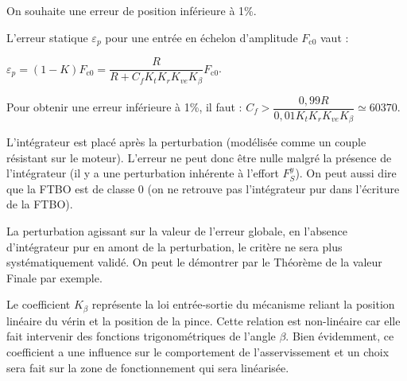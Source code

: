 On souhaite une erreur de position inférieure à 1\%.

\ifprof
\begin{corrige}
L’erreur statique $\varepsilon_p$ pour une entrée en échelon d’amplitude $F_{\text{c0}}$ vaut :

$\varepsilon_p=(1-K) F_{\text{c0}}=\dfrac{R}{R+C_f K_t K_r K_{ve} K_{\beta} } F_{\text{c0}}$.

Pour obtenir une erreur inférieure à 1\%, il faut :
$C_f>\dfrac{0,99R}{0,01K_t K_r K_{ve} K_{\beta} } \simeq 60370$.

\end{corrige}
\else
\fi

\ifprof
\begin{corrige}
L’intégrateur est placé  après la perturbation (modélisée comme un couple résistant sur le moteur). L’erreur ne peut donc être nulle malgré la présence de l’intégrateur (il y a une perturbation inhérente à l’effort $F_S^y$).
On peut aussi dire que la FTBO est de classe 0 (on ne retrouve pas l’intégrateur pur dans l’écriture de la FTBO).

\end{corrige}
\else
\fi

\ifprof
\begin{corrige}
La perturbation agissant sur la valeur de l’erreur globale, en l’absence d’intégrateur pur en amont de la perturbation, le critère ne sera plus systématiquement validé. On peut le démontrer par le Théorème de la valeur Finale par exemple.
\end{corrige}
\else
\fi

\ifprof
\begin{corrige}
Le coefficient $K_{\beta}$ représente la loi entrée-sortie du mécanisme reliant la position linéaire du vérin et la position de la pince. Cette relation est non-linéaire car elle fait intervenir des fonctions trigonométriques de l’angle ${\beta}$. Bien évidemment, ce coefficient a une influence sur le comportement de l’asservissement et un choix sera fait sur la zone de fonctionnement qui sera linéarisée.
\end{corrige}
\else
\fi

